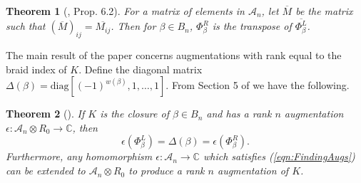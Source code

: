 \documentclass[11pt]{amsart}
\def\C{{\mathbb C}}
\def\A{{\mathcal A}}
\newtheorem{thm}{Theorem}[section]
\theoremstyle{definition}
\begin{document}
  \begin{thm}[\cite{Ng05}, Prop.\hspace*{-0.7pt} 6.2]For a matrix of elements in $\A_n$, let $\overline{M}$ be the matrix such that $\left(\overline M\right)_{ij} = \overline{M_{ij}}$. Then for $\beta\in B_n$, $\Phi_\beta^R$ is the transpose of $\overline{\Phi_\beta^L}$.
  \label{thm:Transpose}
  \end{thm}

  The main result of the paper concerns augmentations with rank equal to the braid index of $K$. Define the diagonal matrix $\Delta(\beta)=\text{diag}[(-1)^{w(\beta)},1,\ldots,1]$. From Section 5 of \cite{Cor13a} we have the following.

  \begin{thm}[\cite{Cor13a}] If $K$ is the closure of $\beta\in B_n$ and has a rank $n$ augmentation $\epsilon:\A_n\otimes R_0\to\C$, then 
    \begin{equation}
    \epsilon(\Phi_\beta^L)=\Delta(\beta)=\epsilon(\Phi_\beta^R).
    \label{eqn:FindingAugs}
    \end{equation}
    Furthermore, any homomorphism $\epsilon:\A_n\to\C$ which satisfies (\ref{eqn:FindingAugs}) can be extended to $\A_n\otimes R_0$ to produce a rank $n$ augmentation of $K$. 
  \label{thm:RanknAugs}
  \end{thm}


\end{document}
